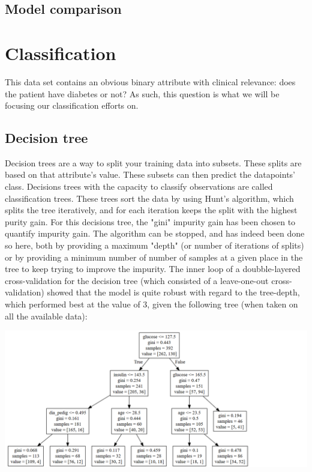 \subsection{Model comparison}


\section{Classification}

This data set contains an obvious binary attribute
with clinical relevance:
does the patient have diabetes or not?
As such, this question is what we will be
focusing our classification efforts on.

\subsection{Decision tree}
Decision trees are a way to split your training data into subsets. These splits are based on that attribute's value.
These subsets can then predict the datapoints' class. Decisions trees with the capacity to classify observations are called
classification trees. These trees sort the data by using Hunt's algorithm, which
splits the tree iteratively, and for each iteration keeps the split with the
highest purity gain. For this decisions tree, the "gini" impurity gain has been
chosen to quantify impurity gain. The algorithm can be stopped, and has indeed
been done so here, both by providing a maximum "depth" (or number of iterations
of splits) or by providing a minimum number of number of samples at a given
place in the tree to keep trying to improve the impurity.
The inner loop of a doubble-layered cross-validation for the decision tree
(which consisted of a leave-one-out cross-validation) showed
that the model is quite robust with regard to the tree-depth, which performed
best at the value of 3, given the following tree (when taken on all the available
data):

\includegraphics[width=\textwidth]{tree.png}

